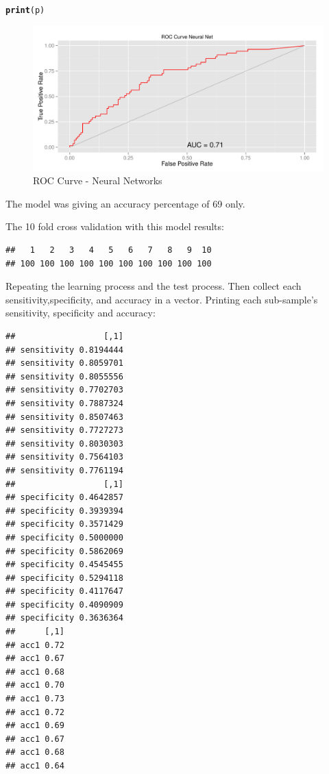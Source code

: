 \documentclass{article}\usepackage[]{graphicx}\usepackage[]{color}
\makeatletter
\def\maxwidth{ %
  \ifdim\Gin@nat@width>\linewidth
    \linewidth
  \else
    \Gin@nat@width
  \fi
}
\newcommand{\hlstd}[1]{\textcolor[rgb]{0.345,0.345,0.345}{#1}}%
\newcommand{\hlkwd}[1]{\textcolor[rgb]{0.737,0.353,0.396}{\textbf{#1}}}%
\newenvironment{kframe}{%
 \def\at@end@of@kframe{}%
 \ifinner\ifhmode%
  \def\at@end@of@kframe{\end{minipage}}%
  \begin{minipage}{\columnwidth}%
 \fi\fi%
 \def\FrameCommand##1{\hskip\@totalleftmargin \hskip-\fboxsep
 \colorbox{shadecolor}{##1}\hskip-\fboxsep
     \hskip-\linewidth \hskip-\@totalleftmargin \hskip\columnwidth}%
 \MakeFramed {\advance\hsize-\width
   \@totalleftmargin\z@ \linewidth\hsize
   \@setminipage}}%
 {\par\unskip\endMakeFramed%
 \at@end@of@kframe}
\newenvironment{knitrout}{}{} %
\makeatother
\begin{document}
\begin{knitrout}
\color{fgcolor}\begin{kframe}
\begin{alltt}
\hlkwd{print}\hlstd{(p)}
\end{alltt}
\end{kframe}\begin{figure}
\includegraphics[width=\maxwidth]{figure/unnamed-chunk-75-1} \caption[ROC Curve - Neural Networks]{ROC Curve - Neural Networks}\label{fig:unnamed-chunk-75}
\end{figure}


\end{knitrout}
The model was giving an accuracy percentage of 69 only.\par
The 10 fold cross validation with this model results:
\begin{knitrout}
\color{fgcolor}\begin{kframe}
\begin{verbatim}
##   1   2   3   4   5   6   7   8   9  10 
## 100 100 100 100 100 100 100 100 100 100
\end{verbatim}
\end{kframe}
\end{knitrout}
Repeating the learning process and the test process. Then collect each sensitivity,specificity, and accuracy in a vector. Printing each sub-sample's sensitivity, specificity and accuracy:
\begin{knitrout}
\color{fgcolor}\begin{kframe}
\begin{verbatim}
##                  [,1]
## sensitivity 0.8194444
## sensitivity 0.8059701
## sensitivity 0.8055556
## sensitivity 0.7702703
## sensitivity 0.7887324
## sensitivity 0.8507463
## sensitivity 0.7727273
## sensitivity 0.8030303
## sensitivity 0.7564103
## sensitivity 0.7761194
##                  [,1]
## specificity 0.4642857
## specificity 0.3939394
## specificity 0.3571429
## specificity 0.5000000
## specificity 0.5862069
## specificity 0.4545455
## specificity 0.5294118
## specificity 0.4117647
## specificity 0.4090909
## specificity 0.3636364
##      [,1]
## acc1 0.72
## acc1 0.67
## acc1 0.68
## acc1 0.70
## acc1 0.73
## acc1 0.72
## acc1 0.69
## acc1 0.67
## acc1 0.68
## acc1 0.64
\end{verbatim}
\end{kframe}
\end{knitrout}
\end{document}
